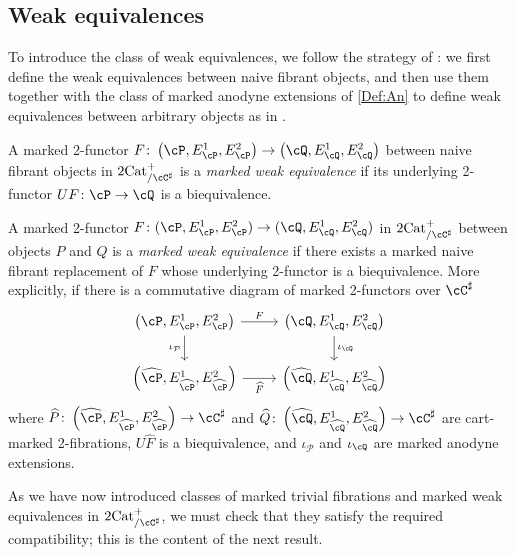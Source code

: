 \documentclass[11pt, dvipsnames]{amsart}
\begin{document}
\subsection{Weak equivalences}\label{sec:weakequivs}
		To introduce the class of weak equivalences, we follow the strategy of \cite{guetta2023fibrantlyinduced}: we first define the weak equivalences between naive fibrant objects, and then use them together with the class of marked anodyne extensions of \cref{Def:An} to define weak equivalences between arbitrary objects as in \cite[Definition 2.4]{guetta2023fibrantlyinduced}.

        \begin{defn}
            A marked 2-functor $F\colon\markedscat{\cP}\to \markedscat{\cQ}$ between naive fibrant objects in $\twocat^{+}_{/\cC^\sharp}$ is a \emph{marked weak equivalence} if its underlying 2-functor $UF\colon\cP\to\cQ$ is a biequivalence. 
        \end{defn}

		\begin{defn}\label{Def:marked_weak_equiv}
			A marked 2-functor $F \colon (\cP,E^1_{\cP},E^2_{\cP}) \to (\cQ,E^1_{\cQ},E^2_{\cQ})$ in $\twocat^{+}_{/\cC^\sharp}$ between objects $P$ and $Q$ is a \emph{marked weak
			equivalence} if there exists a marked naive fibrant replacement of $F$ whose underlying 2-functor is a biequivalence.
			More explicitly, if there is a commutative diagram of marked 2-functors over $\cC^\sharp$
			\[
				\begin{tikzcd}
				\markedscat{\cP} \arrow[r,"F"] \arrow[d,"\iota_{\mathcal P}"'] & \markedscat{\cQ} \arrow[d,"\iota_{\cQ}"]
				\\
				\markedscat{\widehat{\cP}}\arrow[r,"\widehat F"'] & \markedscat{\widehat{\cQ}} 
				\end{tikzcd}
			\]
			where $\widehat{P}\colon \markedscat{\widehat{\cP}}\to\cC^\sharp$ and  $\widehat{Q}\colon \markedscat{\widehat{\cQ}}\to\cC^\sharp$ are cart-marked 2-fibrations, $U\widehat F$ is a biequivalence, and $\iota_{\mathcal P}$ and $\iota_{\cQ}$ are marked anodyne extensions.
		\end{defn}

        As we have now introduced classes of marked trivial fibrations and marked weak equivalences in $\twocat^{+}_{/\cC^\sharp}$, we must check that they satisfy the required compatibility; this is the content of the next result.
\end{document}
